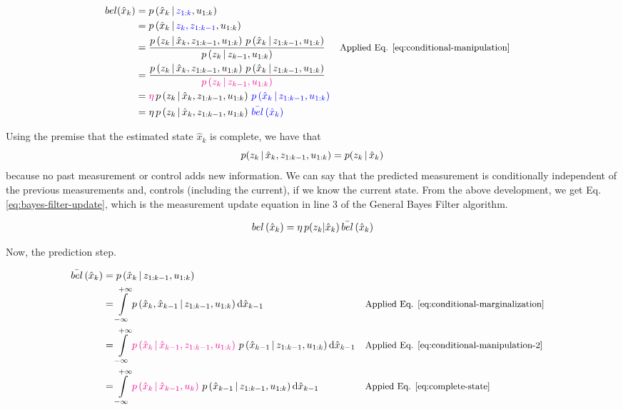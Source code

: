 \documentclass[12pt]{article}
\begin{document}
\begin{equation}
    \begin{aligned}
        \bel(\hat{x}_k) &= \pr{\hat{x}_k \given \blue{z_{1:k}}, u_{1:k}}\\
        &= \pr{\hat{x}_k \given \blue{z_k, z_{1:k-1}}, u_{1:k}} \\
        &= \dfrac{\pr{z_k \given \hat{x}_k, z_{1:k-1}, u_{1:k}} \, \pr{\hat{x}_k \given z_{1:k-1}, u_{1:k}}}{\pr{z_k \given z_{k-1}, u_{1:k}}} && \small\text{Applied Eq. \ref{eq:conditional-manipulation}}\\
        &= \dfrac{\pr{z_k \given \hat{x}_k, z_{1:k-1}, u_{1:k}} \, \pr{\hat{x}_k \given z_{1:k-1}, u_{1:k}}}{\magenta{\pr{z_k \given z_{k-1}, u_{1:k}}}}\\
        &= \magenta\eta \, \pr{z_k \given \hat{x}_k, z_{1:k-1}, u_{1:k}} \, \blue{\pr{\hat{x}_k \given z_{1:k-1}, u_{1:k}}}\\
        &= \eta \, \pr{z_k \given \hat{x}_k, z_{1:k-1}, u_{1:k}} \, \blue{\bar{\bel}\parentheses{\hat{x}_k}}
    \end{aligned}
\end{equation}

Using the premise that the estimated state $\hat{x}_k$ is complete, we have that 
\begin{equation}
 p(z_k \,|\, \hat{x}_k, z_{1:k-1}, u_{1:k}) = p(z_k \given \hat{x}_k)   
\end{equation}
because no past measurement or control adds new information. We can say that the predicted measurement is conditionally independent of the previous measurements and, controls (including the current), if we know the current state. From the above development, we get Eq. \ref{eq:bayes-filter-update}, which is the measurement update equation in line 3 of the General Bayes Filter algorithm.

\begin{equation}
    \belF{\hat{x}_k} = \eta \, p(z_k | \hat{x}_k) \color{black}\,\bar{\bel}\parentheses{\hat{x}_k}
    \label{eq:bayes-filter-update}
\end{equation}

Now, the prediction step.

\begin{equation}
\begin{aligned}
    \bar{\bel}\parentheses{\hat{x}_k} &= \pr{\hat{x}_k \given z_{1:k-1}, u_{1:k}} \\
    &= \Int[\hat{x}_{k-1}]{-\infty}{+\infty}{\pr{\hat{x}_k, \hat{x}_{k-1} \given z_{1:k-1}, u_{1:k}}} && \small\text{Applied Eq. \ref{eq:conditional-marginalization}} \\
    &= \Int[\hat{x}_{k-1}]{-\infty}{+\infty}{\magenta{\pr{\hat{x}_k \given \hat{x}_{k-1}, z_{1:k-1}, u_{1:k}}} \, \pr{\hat{x}_{k-1} \given z_{1:k-1}, u_{1:k}} } && \small\text{Applied Eq. \ref{eq:conditional-manipulation-2}}\\
    &= \Int[\hat{x}_{k-1}]{-\infty}{+\infty}{\magenta{\pr{\hat{x}_k \given \hat{x}_{k-1}, u_k}} \, \pr{\hat{x}_{k-1} \given z_{1:k-1}, u_{1:k}} } && \small\text{Appied Eq. \ref{eq:complete-state}}
\end{aligned}
\end{equation}
\end{document}
